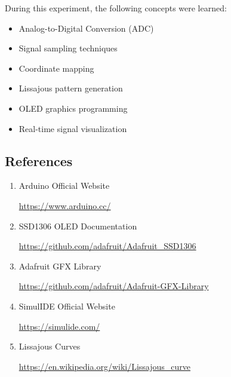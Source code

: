 During this experiment, the following concepts were learned:

\begin{itemize}

\item Analog-to-Digital Conversion (ADC)

\item Signal sampling techniques

\item Coordinate mapping

\item Lissajous pattern generation

\item OLED graphics programming

\item Real-time signal visualization

\end{itemize}


\subsection{References}

\begin{enumerate}

\item Arduino Official Website

\url{https://www.arduino.cc/}

\item SSD1306 OLED Documentation

\url{https://github.com/adafruit/Adafruit_SSD1306}

\item Adafruit GFX Library

\url{https://github.com/adafruit/Adafruit-GFX-Library}

\item SimulIDE Official Website

\url{https://simulide.com/}

\item Lissajous Curves

\url{https://en.wikipedia.org/wiki/Lissajous_curve}

\end{enumerate}


\clearpage